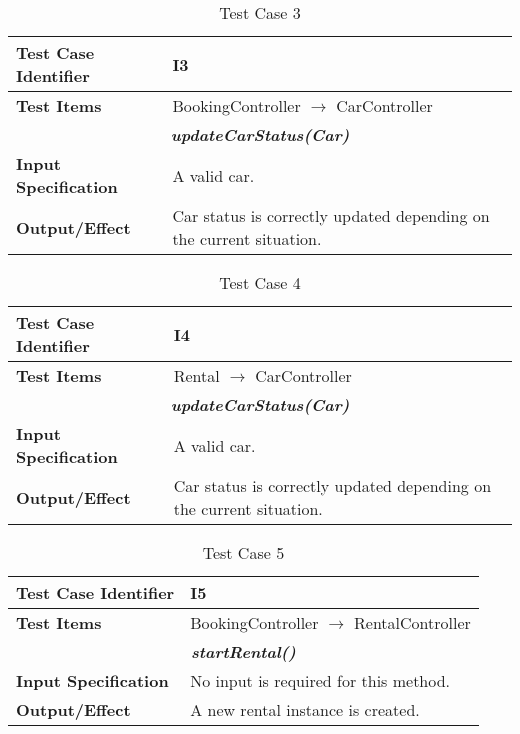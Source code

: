 \begin{table}[H]
	\begin{tabularx}{\textwidth}{l X}
		\hline
		\textbf{Test Case Identifier}	&	I3\\	\hline
		\textbf{Test Items}			&	BookingController $\rightarrow$ CarController \\	\hline\hline
		\multicolumn{2}{c}{\textbf{\textit{updateCarStatus(Car)}}}	\\	\hline
			\textbf{Input Specification}	&	A valid car.\\	\hline
			\textbf{Output/Effect}	&	Car status is correctly updated depending on the current situation.\\	\hline
	\end{tabularx}
	\captionsetup{textformat=empty,labelformat=blank}
	\caption{Test Case 3}
	\label{table:template-table-3}
\end{table}

\begin{table}[H]
	\begin{tabularx}{\textwidth}{l X}
		\hline
		\textbf{Test Case Identifier}	&	I4\\	\hline
		\textbf{Test Items}			&	Rental $\rightarrow$ CarController \\	\hline\hline
		\multicolumn{2}{c}{\textbf{\textit{updateCarStatus(Car)}}}	\\	\hline
			\textbf{Input Specification}	&	A valid car.\\	\hline
			\textbf{Output/Effect}	&	Car status is correctly updated depending on the current situation.\\	\hline
	\end{tabularx}
	\captionsetup{textformat=empty,labelformat=blank}
	\caption{Test Case 4}
	\label{table:template-table-4}
\end{table}

\begin{table}[H]
	\begin{tabularx}{\textwidth}{l X}
		\hline
		\textbf{Test Case Identifier}	&	I5\\	\hline
		\textbf{Test Items}			&	BookingController $\rightarrow$ RentalController \\	\hline\hline
		\multicolumn{2}{c}{\textbf{\textit{startRental()}}}	\\	\hline
			\textbf{Input Specification}	&	No input is required for this method.\\	\hline
			\textbf{Output/Effect}	&	A new rental instance is created.\\	\hline
	\end{tabularx}
	\captionsetup{textformat=empty,labelformat=blank}
	\caption{Test Case 5}
	\label{table:template-table-5}
\end{table}

